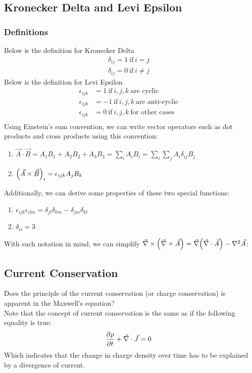 \documentclass{article}
\begin{document}
\subsection*{Kronecker Delta and Levi Epsilon}
\subsubsection*{Definitions}
Below is the definition for Kronecker Delta 
\begin{align*}
  \delta_{ij} = 1 \ \text{if} \ i = j \\
  \delta_{ij} = 0 \ \text{if} \ i \neq j
\end{align*}
Below is the definition for Levi Epsilon
\begin{align*}
  \epsilon_{ijk} &= 1 \ \text{if} \ i,j,k \ \text{are cyclic} \\
  \epsilon_{ijk} &= -1 \ \text{if} \ i,j,k \ \text{are anti-cyclic} \\ 
  \epsilon_{ijk} &= 0 \ \text{if} \ i,j,k \ \text{for other cases} \\ 
\end{align*}
Using Einstein's sum convention, we can write vector operators such as dot products and cross products using this convention:
\begin{enumerate}
  \item $\vec{A} \cdot \vec{B}  = A_1 B_1 + A_2 B_2 + A_3 B_3 = \sum_{i} A_i B_i = \sum_{i} \sum_{j}A_i \delta_{i j} B_j$
  \item $\qty(\vec{A} \times  \vec{B} )_i=\epsilon_{ijk} A_j B_k $
\end{enumerate}
Additionally, we can derive some properties of these two special functions:
\begin{enumerate}
  \item $\epsilon_{ijk} \epsilon_{ilm} = \delta_{jl} \delta_{km} - \delta_{jm}\delta_{kl}$
  \item $\delta_{ii} = 3$
\end{enumerate}
With such notation in mind, we can simplify $\vec{\nabla} \times \qty(\vec{\nabla} \times \vec{A}  ) = \vec{\nabla}\qty(\vec{\nabla} \cdot \vec{A} ) - \laplacian \vec{A}$:
\subsection*{Current Conservation}
Does the principle of the current conservation (or charge conservation) is apparent in the Maxwell's equation? \\ 
Note that the concept of current conservation is the same as if the following equality is true:
\begin{equation*}
  \pdv{\rho}{t} + \vec{\nabla} \cdot  \vec{J} = 0
\end{equation*}
Which indicates that the change in charge density over time has to be explained by a divergence of current. 
\end{document}
